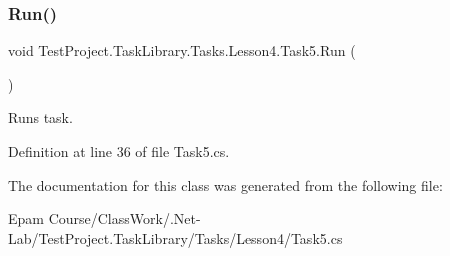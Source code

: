 \subsubsection{\texorpdfstring{Run()}{Run()}}
{\footnotesize\ttfamily void Test\+Project.\+Task\+Library.\+Tasks.\+Lesson4.\+Task5.\+Run (\begin{DoxyParamCaption}{ }\end{DoxyParamCaption})}



Runs task. 



Definition at line 36 of file Task5.\+cs.



The documentation for this class was generated from the following file\+:\begin{DoxyCompactItemize}
\item 
Epam Course/\+Class\+Work/.\+Net-\/\+Lab/\+Test\+Project.\+Task\+Library/\+Tasks/\+Lesson4/Task5.\+cs\end{DoxyCompactItemize}
